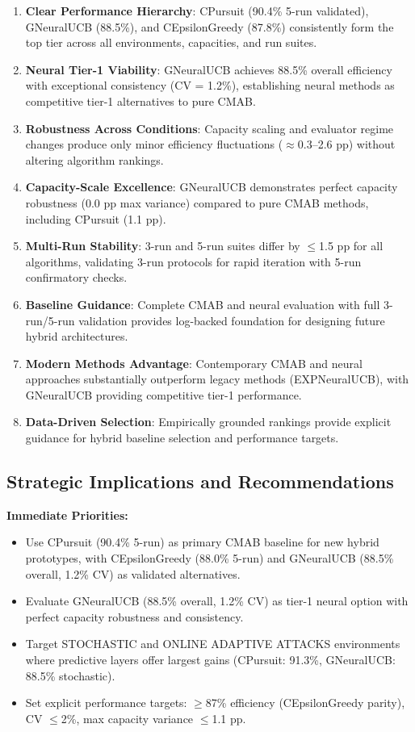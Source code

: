 \documentclass[12pt,a4paper]{article}
\newcommand{\success}[1]{\textcolor{successcolor}{\textbf{#1}}}
\newcommand{\legacy}[1]{\textcolor{legacycolor}{\textbf{#1}}}
\newcommand{\neural}[1]{\textcolor{neuralcolor}{\textbf{#1}}}
\begin{document}
\begin{enumerate}
\item \textbf{Clear Performance Hierarchy}: CPursuit (90.4\% 5-run validated), GNeuralUCB (88.5\%), and CEpsilonGreedy (87.8\%) consistently form the top tier across all environments, capacities, and run suites.
\item \neural{Neural Tier-1 Viability}: GNeuralUCB achieves 88.5\% overall efficiency with exceptional consistency (CV = 1.2\%), establishing neural methods as competitive tier-1 alternatives to pure CMAB.
\item \textbf{Robustness Across Conditions}: Capacity scaling and evaluator regime changes produce only minor efficiency fluctuations ($\approx$0.3--2.6 pp) without altering algorithm rankings.
\item \neural{Capacity-Scale Excellence}: GNeuralUCB demonstrates perfect capacity robustness (0.0 pp max variance) compared to pure CMAB methods, including CPursuit (1.1 pp).
\item \success{Multi-Run Stability}: 3-run and 5-run suites differ by $\leq$1.5 pp for all algorithms, validating 3-run protocols for rapid iteration with 5-run confirmatory checks.
\item \textbf{Baseline Guidance}: Complete CMAB and neural evaluation with full 3-run/5-run validation provides log-backed foundation for designing future hybrid architectures.
\item \legacy{Modern Methods Advantage}: Contemporary CMAB and neural approaches substantially outperform legacy methods (EXPNeuralUCB), with GNeuralUCB providing competitive tier-1 performance.
\item \textbf{Data-Driven Selection}: Empirically grounded rankings provide explicit guidance for hybrid baseline selection and performance targets.
\end{enumerate}

\subsection{Strategic Implications and Recommendations}

\textbf{Immediate Priorities:}
\begin{itemize}
\item Use CPursuit (90.4\% 5-run) as primary CMAB baseline for new hybrid prototypes, with CEpsilonGreedy (88.0\% 5-run) and GNeuralUCB (88.5\% overall, 1.2\% CV) as validated alternatives.
\item Evaluate GNeuralUCB (88.5\% overall, 1.2\% CV) as tier-1 neural option with perfect capacity robustness and consistency.
\item Target STOCHASTIC and ONLINE ADAPTIVE ATTACKS environments where predictive layers offer largest gains (CPursuit: 91.3\%, GNeuralUCB: 88.5\% stochastic).
\item Set explicit performance targets: $\geq$87\% efficiency (CEpsilonGreedy parity), CV $\leq$2\%, max capacity variance $\leq$1.1 pp.
\end{itemize}
\end{document}
